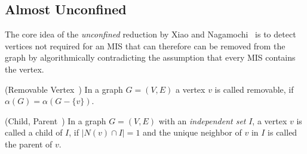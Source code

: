 \documentclass[a4paper,UKenglish,cleveref, autoref, thm-restate]{lipics-v2021}
\begin{document}


 
\subsection{Almost Unconfined}
\label{sec:almost_unconfined}

The core idea of the \emph{unconfined} reduction by Xiao and
Nagamochi~\cite{XiaoUnconfined} is to detect vertices not required for an MIS
that can therefore can be removed from the graph by algorithmically
contradicting the assumption that every MIS contains the vertex.

\begin{definition} (Removable Vertex~\cite{XiaoUnconfined})
	In a graph $G=(V,E)$ a vertex $v$ is called removable, if 
	$\alpha(G) = \alpha(G-\{v\})$.
\end{definition}

\begin{definition} (Child, Parent~\cite{XiaoUnconfined}) In a graph $G=(V,E)$ with an \textit{independent set} $I$, a vertex $v$ is called a child of $I$, if $|N(v)\cap I| = 1$ and the unique neighbor of $v$ in $I$ is called the parent of $v$.
\end{definition}
\end{document}
